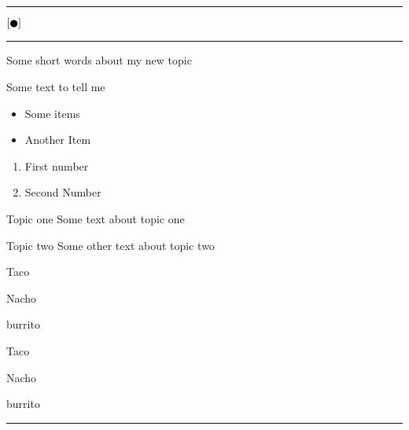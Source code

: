 \documentclass[landscape, a4paper]{article}
\title{}
\author{}
\newcommand{\myline}{\vspace{4pt}\hrule  \vspace{4pt}}
\newcommand{\legalblob}{\ensuremath{ \left[ \newmoon \right] } \xspace}
\newenvironment{topic}[1]{
	\noindent \textbf{\textsc{\color{harvardcrimson}{#1}}}
	\noindent \hspace{-3.5pt}
}{
	\myline
}
\newenvironment{tellme}[1]{
	\noindent \textbf{\textit{\color{harvardblue}{#1}}}
	\begin{adjustwidth}{9pt}{}
}{
	\end{adjustwidth}
}
\newenvironment{compactitem}{
	\begin{itemize}[leftmargin=*,labelsep=5pt]
}{
	\end{itemize}
}
\newenvironment{compactenum}{
	\begin{enumerate}[leftmargin=*,labelsep=5pt]
}{
	\end{enumerate}
}
\newenvironment{compactdesc}{
	\begin{description}[leftmargin=1em,labelsep=0.7em, font=\normalfont\itshape]
}{
	\end{description}
}
\begin{document}
	\footnotesize

	\begin{multicols*}{3}

	\hfill
		\vspace{-1\baselineskip}
	\hfill
	
	\myline
		\vspace{-0.2cm}
		\begin{center}
			\LARGE \textsc{\legalblob} 
		\end{center}
		\vspace{-0.2cm}
	\myline 
	
	\begin{topic}{A New Topic} 
		Some short words about my new topic

		\begin{tellme}{This is the first tell me block}
			Some text to tell me

			\begin{compactitem}
				\item Some items
				\item Another Item
			\end{compactitem}

			\begin{compactenum}
				\item First number
				\item Second Number
			\end{compactenum}

			\begin{compactdesc}
				\item[Topic one] Some text about topic one
				\item[Topic two] Some other text about topic two
			\end{compactdesc}
      
      \begin{cproof}
        \item Taco
        \item Nacho
        \begin{cproof}
          \item burrito
        \end{cproof}
      \end{cproof}
      
      \begin{lproof}
        \item Taco
        \item Nacho
        \begin{lproof}
          \item burrito
        \end{lproof}
      \end{lproof}

		\end{tellme}
	\end{topic}

\end{multicols*}
\end{document}
